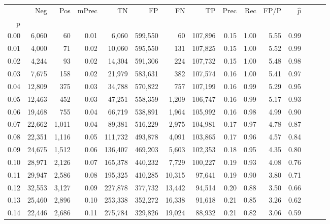 \begin{tabular}{rrrrrrrrrrrrrrr}
\toprule
{} &     Neg &    Pos & mPrec &       TN &       FP &       FN &       TP &  Prec &   Rec &  FP/P & $\hat{p}$ \\
p    &         &        &       &          &          &          &          &       &       &       &           \\
\midrule
0.00 &   6,060 &     60 &  0.01 &    6,060 &  599,550 &       60 &  107,896 &  0.15 &  1.00 &  5.55 &      0.99 \\
0.01 &   4,000 &     71 &  0.02 &   10,060 &  595,550 &      131 &  107,825 &  0.15 &  1.00 &  5.52 &      0.99 \\
0.02 &   4,244 &     93 &  0.02 &   14,304 &  591,306 &      224 &  107,732 &  0.15 &  1.00 &  5.48 &      0.98 \\
0.03 &   7,675 &    158 &  0.02 &   21,979 &  583,631 &      382 &  107,574 &  0.16 &  1.00 &  5.41 &      0.97 \\
0.04 &  12,809 &    375 &  0.03 &   34,788 &  570,822 &      757 &  107,199 &  0.16 &  0.99 &  5.29 &      0.95 \\
0.05 &  12,463 &    452 &  0.03 &   47,251 &  558,359 &    1,209 &  106,747 &  0.16 &  0.99 &  5.17 &      0.93 \\
0.06 &  19,468 &    755 &  0.04 &   66,719 &  538,891 &    1,964 &  105,992 &  0.16 &  0.98 &  4.99 &      0.90 \\
0.07 &  22,662 &  1,011 &  0.04 &   89,381 &  516,229 &    2,975 &  104,981 &  0.17 &  0.97 &  4.78 &      0.87 \\
0.08 &  22,351 &  1,116 &  0.05 &  111,732 &  493,878 &    4,091 &  103,865 &  0.17 &  0.96 &  4.57 &      0.84 \\
0.09 &  24,675 &  1,512 &  0.06 &  136,407 &  469,203 &    5,603 &  102,353 &  0.18 &  0.95 &  4.35 &      0.80 \\
0.10 &  28,971 &  2,126 &  0.07 &  165,378 &  440,232 &    7,729 &  100,227 &  0.19 &  0.93 &  4.08 &      0.76 \\
0.11 &  29,947 &  2,586 &  0.08 &  195,325 &  410,285 &   10,315 &   97,641 &  0.19 &  0.90 &  3.80 &      0.71 \\
0.12 &  32,553 &  3,127 &  0.09 &  227,878 &  377,732 &   13,442 &   94,514 &  0.20 &  0.88 &  3.50 &      0.66 \\
0.13 &  25,460 &  2,896 &  0.10 &  253,338 &  352,272 &   16,338 &   91,618 &  0.21 &  0.85 &  3.26 &      0.62 \\
0.14 &  22,446 &  2,686 &  0.11 &  275,784 &  329,826 &   19,024 &   88,932 &  0.21 &  0.82 &  3.06 &      0.59 \\

\end{tabular}
